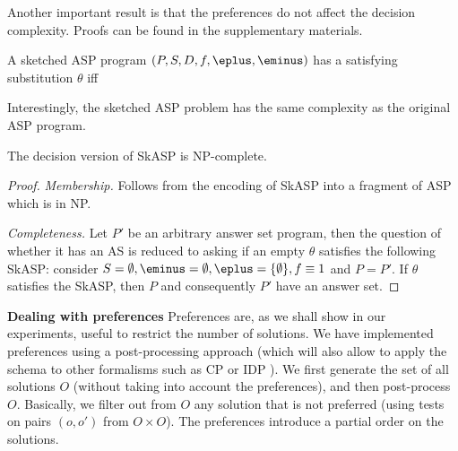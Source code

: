 Another important result is that the preferences do not affect the decision complexity. Proofs can be found in the supplementary materials. 
\begin{theorem}
  A sketched ASP program $(P, S, D, f, \eplus,\eminus)$ has a satisfying substitution $\theta$ iff 
  \label{theorem:rewriting}
\end{theorem}
Interestingly, the sketched ASP problem has the same complexity as the original ASP program.
\begin{theorem}
  The decision version of SkASP is NP-complete.
  \label{theorem:complexity_sat}
\end{theorem}
\begin{proof} \emph{Membership.}
Follows from the encoding of SkASP into a fragment of ASP which is in NP. 

\emph{Completeness.}
Let $P'$ be an arbitrary answer set program, then the question of whether it has an AS is reduced to asking if an empty $\theta$ satisfies the following SkASP: consider $S = \emptyset, \eminus = \emptyset,\eplus = \{ \emptyset \},f\equiv1$ and $P=P'$. If $\theta$ satisfies the SkASP, then $P$ and consequently $P'$ have an answer set.
\end{proof}
\textbf{Dealing with preferences} 
Preferences are, as we shall show in our experiments, useful to restrict the number of solutions.
We have implemented preferences using a post-processing approach (which will also allow to apply the schema to other formalisms such as CP or IDP \parencite{idp}).
We first generate the set of all solutions $O$ (without taking into account the preferences), and then post-process $O$. Basically, we filter out
from $O$ any solution that is not preferred (using tests on pairs $(o,o')$ from $O \times O$). %
The preferences introduce a partial order on the solutions. 

